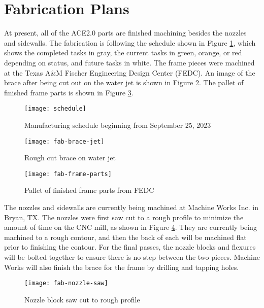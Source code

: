\section{Fabrication Plans}

At present, all of the ACE2.0 parts are finished machining besides the nozzles and sidewalls. The fabrication is following the schedule shown in Figure \ref{fig:schedule}, which shows the completed tasks in gray, the current tasks in green, orange, or red depending on status, and future tasks in white. The frame pieces were machined at the Texas A\&M Fischer Engineering Design Center (FEDC). An image of the brace after being cut out on the water jet is shown in Figure \ref{fig:fab-brace-jet}. The pallet of finished frame parts is shown in Figure \ref{fig:fab-frame-parts}.

\begin{figure}[ht!]
    \centering
    \texttt{[image: schedule]}
    \caption{Manufacturing schedule beginning from September 25, 2023}
    \label{fig:schedule}
\end{figure}

\begin{figure}[ht!]
    \centering
    \texttt{[image: fab-brace-jet]}
    \caption{Rough cut brace on water jet}
    \label{fig:fab-brace-jet}
\end{figure}

\begin{figure}[ht!]
    \centering
    \texttt{[image: fab-frame-parts]}
    \caption{Pallet of finished frame parts from FEDC}
    \label{fig:fab-frame-parts}
\end{figure}

The nozzles and sidewalls are currently being machined at Machine Works Inc. in Bryan, TX. The nozzles were first saw cut to a rough profile to minimize the amount of time on the CNC mill, as shown in Figure \ref{fig:fab-nozzle-saw}. They are currently being machined to a rough contour, and then the back of each will be machined flat prior to finishing the contour. For the final passes, the nozzle blocks and flexures will be bolted together to ensure there is no step between the two pieces. Machine Works will also finish the brace for the frame by drilling and tapping holes.

\begin{figure}[ht!]
    \centering
    \texttt{[image: fab-nozzle-saw]}
    \caption{Nozzle block saw cut to rough profile}
    \label{fig:fab-nozzle-saw}
\end{figure}

